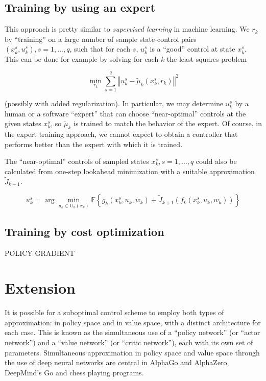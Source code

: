 \documentclass[
]{book}
\theoremstyle{definition}
\theoremstyle{definition}
\theoremstyle{definition}
\theoremstyle{definition}
\theoremstyle{remark}
\begin{document}
\hypertarget{training-by-using-an-expert}{%
\subsection{Training by using an expert}\label{training-by-using-an-expert}}

This approach is pretty similar to \emph{supervised learning} in machine learning. We \(r_k\) by ``training'' on a large number of sample state-control pairs \((x_k^s, u_k^s), s=1, ... ,q\), such that for each \(s\), \(u_k^s\) is a ``good'' control at state \(x_k^s\). This can be done for example by solving for each \(k\) the least squares problem

\begin{equation}
\min_{r_k} \sum_{s=1}^q \left\Vert{u_k^s - \tilde \mu_k(x_k^s,r_k)}\right\Vert^2
\end{equation}

(possibly with added regularization). In particular, we may determine \(u_k^s\) by a human or a software ``expert'' that can choose ``near-optimal'' controls at the given states \(x_k^s\), so \(\tilde{\mu}_k\) is trained to match the behavior of the expert. Of course, in the expert training approach, we cannot expect to obtain a controller that performs better than the expert with which it is trained.

The ``near-optimal'' controls of sampled states \(x_k^s, s = 1, ...,q\) could also be calculated from one-step lookahead minimization with a suitable approximation \(\tilde{J}_{k+1}\).

\begin{equation}
u_k^s = \arg \min_{u_k \in \mathbb{U}_k (x_k)} \displaystyle \mathbb{E} \displaystyle \left\{g_k(x_k^s,u_k,w_k) + \tilde J_{k+1} (f_k(x_k^s,u_k,w_k) ) \right\}
\end{equation}

\hypertarget{training-by-cost-optimization}{%
\subsection{Training by cost optimization}\label{training-by-cost-optimization}}

POLICY GRADIENT

\hypertarget{extension}{%
\section{Extension}\label{extension}}

It is possible for a suboptimal control scheme to employ both types of approximation: in policy space and in value space, with a distinct architecture for each case. This is known as the simultaneous use of a ``policy network'' (or ``actor network'') and a ``value network'' (or ``critic network''), each with its own set of parameters. Simultaneous approximation in policy space and value space through the use of deep neural networks are central in AlphaGo and AlphaZero, DeepMind's Go and chess playing programs.
\end{document}
